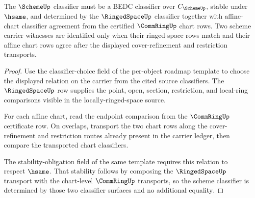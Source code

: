\begin{theorem}\label{thm:scheme-classifier-obligation}
The $\SchemeUp$ classifier must be a BEDC classifier over $C_{\SchemeUp}$, stable under $\hsame$, and determined by the $\RingedSpaceUp$ classifier together with affine-chart classifier agreement from the certified $\CommRingUp$ chart rows. Two scheme carrier witnesses are identified only when their ringed-space rows match and their affine chart rows agree after the displayed cover-refinement and restriction transports.
\end{theorem}
\begin{proof}
Use the classifier-choice field of the per-object roadmap template to choose the displayed relation on the carrier from the cited source classifiers. The $\RingedSpaceUp$ row supplies the point, open, section, restriction, and local-ring comparisons visible in the locally-ringed-space source.

For each affine chart, read the endpoint comparison from the $\CommRingUp$ certificate row. On overlaps, transport the two chart rows along the cover-refinement and restriction routes already present in the carrier ledger, then compare the transported chart classifiers.

The stability-obligation field of the same template requires this relation to respect $\hsame$. That stability follows by composing the $\RingedSpaceUp$ transport with the chart-level $\CommRingUp$ transports, so the scheme classifier is determined by those two classifier surfaces and no additional equality.
\end{proof}

